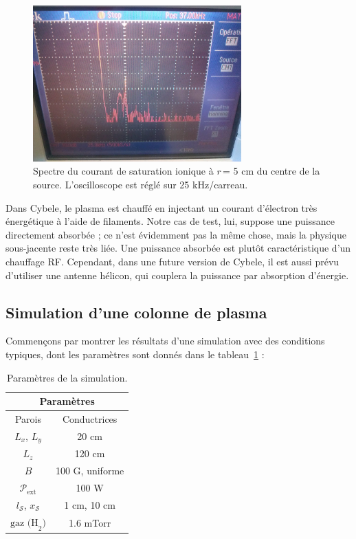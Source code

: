 \begin{refsection}
\begin{figure}[!htbp]
    \includegraphics[height=6cm]{figures/4-CybeleFourierSignal.jpg}
    \caption{Spectre du courant de saturation
    ionique à $r\,$= 5 cm du centre de la source.
    L'oscilloscope est réglé sur 25 kHz/carreau.\label{4-CybeleFourierSignal}}
\end{figure}

Dans Cybele, le plasma est chauffé en injectant un courant
d'électron très énergétique à l'aide de filaments. Notre cas de
test, lui, suppose une puissance directement absorbée ; ce n'est évidemment pas
la même chose, mais la physique sous-jacente reste très liée. Une puissance
absorbée est plutôt caractéristique d'un chauffage RF. Cependant, dans une future version de Cybele, il est aussi
prévu d'utiliser une antenne hélicon, qui couplera la puissance par absorption d'énergie.
 
\subsection{Simulation d'une colonne de plasma}

Commençons par montrer les résultats d'une simulation avec des conditions
typiques, dont les paramètres sont donnés dans le tableau~\ref{4-CybeleParam1} :

\begin{table}[!htbp]
\footnotesize\centering
{}
\begin{tabular}{cc}\toprule
\multicolumn{2}{c}{\bf Paramètres}\\
\midrule 
Parois & Conductrices\\
$L_x$, $L_y$ & 20 cm\\
$L_z$ & 120 cm\\
$B$&100 G, uniforme\\
$\mathcal{P}_\text{ext}$&100 W\\
$l_\mathcal{S}$, $x_\mathcal{S}$& 1 cm, 10 cm\\
$\text{gaz (H}_2\text{)}$ & 1.6 mTorr\\
\bottomrule
\end{tabular}
\caption{Paramètres de la simulation.}\label{4-CybeleParam1}
\end{table}


\end{refsection}
